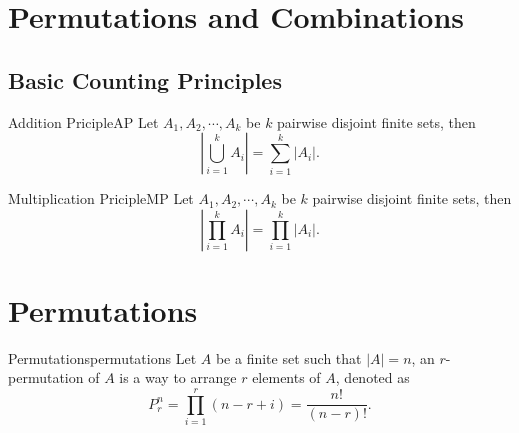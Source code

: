 \documentclass[math]{amznotes}
\theoremstyle{remark}
\begin{document}
\tableofcontents

\chapter{Permutations and Combinations}
\section{Basic Counting Principles}
\begin{thmbox}{Addition Priciple}{AP}
   Let $A_1, A_2, \cdots, A_k$ be $k$ pairwise disjoint finite sets, then
   \begin{equation*}
        \left|\bigcup_{i = 1}^k A_i\right| = \sum_{i = 1}^{k}\left|{A_i}\right|.
   \end{equation*} 
\end{thmbox}
\begin{thmbox}{Multiplication Priciple}{MP}
    Let $A_1, A_2, \cdots, A_k$ be $k$ pairwise disjoint finite sets, then
    \begin{equation*}
        \left|\prod_{i = 1}^{k}A_i\right| = \prod_{i = 1}^{k}\left|A_i\right|.
    \end{equation*}
\end{thmbox}
\chapter{Permutations}
\begin{dfnbox}{Permutations}{permutations}
    Let $A$ be a finite set such that $\left|A\right| = n$, an $r$-permutation of $A$ is a way to arrange $r$ elements of $A$, denoted as
    \begin{equation*}
        P^n_r = \prod_{i = 1}^{r}(n - r + i) = \frac{n!}{(n - r)!}.
    \end{equation*}
\end{dfnbox}
\end{document}
